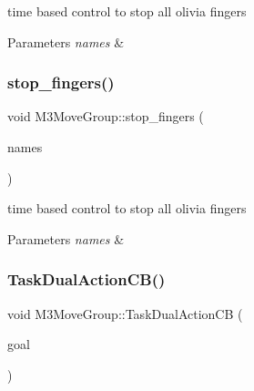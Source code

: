 time based control to stop all olivia fingers 


\begin{DoxyParams}{Parameters}
{\em names} & \\
\hline
\end{DoxyParams}
\mbox{\label{classM3MoveGroup_aedb5d4a4aaeebd2ef3fa0d54edb0efaa}} 
\subsubsection{\texorpdfstring{stop\+\_\+fingers()}{stop\_fingers()}\hspace{0.1cm}{\footnotesize\ttfamily [2/2]}}
{\footnotesize\ttfamily void M3\+Move\+Group\+::stop\+\_\+fingers (\begin{DoxyParamCaption}\item[{std\+::vector$<$ std\+::string $>$}]{names }\end{DoxyParamCaption})\hspace{0.3cm}{\ttfamily [inline]}}



time based control to stop all olivia fingers 


\begin{DoxyParams}{Parameters}
{\em names} & \\
\hline
\end{DoxyParams}
\mbox{\label{classM3MoveGroup_a4999726d3def40e06217e81fb7f095ab}} 
\subsubsection{\texorpdfstring{Task\+Dual\+Action\+C\+B()}{TaskDualActionCB()}\hspace{0.1cm}{\footnotesize\ttfamily [1/2]}}
{\footnotesize\ttfamily void M3\+Move\+Group\+::\+Task\+Dual\+Action\+CB (\begin{DoxyParamCaption}\item[{const m3\+\_\+moveit\+::\+Moveit\+Dual\+Goal\+Const\+Ptr \&}]{goal }\end{DoxyParamCaption})\hspace{0.3cm}{\ttfamily [inline]}}



